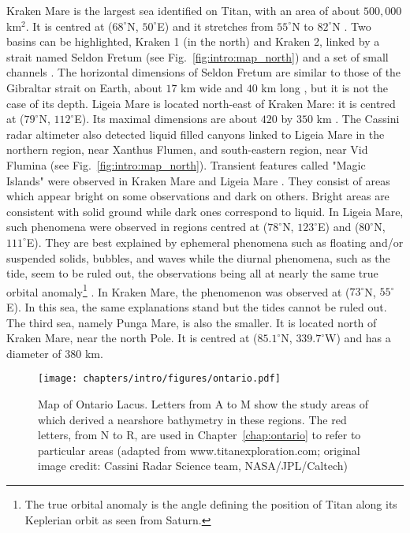  Kraken Mare is the largest sea identified on Titan, with an area of about $500,000$ km$^2$. It is centred at ($68^\circ$N, $50^\circ$E) \citep{tokano2010simulation} and it stretches from $55^\circ$N to $82^\circ$N \citep{lorenz2014radar}. Two basins can be highlighted, Kraken 1 (in the north) and Kraken 2, linked by a strait named Seldon Fretum (see Fig.~\ref{fig:intro:map_north}) and a set of small channels \citep{lorenz2014radar}. The horizontal dimensions of Seldon Fretum are similar to those of the Gibraltar strait on Earth, about $17$ km wide and $40$ km long \citep{lorenz2014radar}, but it is not the case of its depth. Ligeia Mare is located north-east of Kraken Mare: it is centred at ($79^\circ$N, $112^\circ$E). Its maximal dimensions are about $420$ by $350$ km \citep{stofan2012shorelines}. The Cassini radar altimeter also detected liquid filled canyons linked to Ligeia Mare in the northern region, near Xanthus Flumen, and south-eastern region, near Vid Flumina \citep{poggiali2016liquid} (see Fig.~\ref{fig:intro:map_north}). Transient features called "Magic Islands" were observed in Kraken Mare and Ligeia Mare \citep{hofgartner2014transient, hofgartner2016titan}. They consist of areas which appear bright on some observations and dark on others. Bright areas are consistent with solid ground while dark ones correspond to liquid. In Ligeia Mare, such phenomena were observed in regions centred at ($78^\circ$N, $123^\circ$E) and ($80^\circ$N, $111^\circ$E). They are best explained by ephemeral phenomena such as floating and/or suspended solids, bubbles, and waves while the diurnal phenomena, such as the tide, seem to be ruled out, the observations being all at nearly the same true orbital anomaly\footnote{The true orbital anomaly is the angle defining the position of Titan along its Keplerian orbit as seen from Saturn.} \citep{hofgartner2016titan}. In Kraken Mare, the phenomenon was observed at ($73^\circ$N, $55^\circ$E). In this sea, the same explanations stand but the tides cannot be ruled out. The third sea, namely Punga Mare, is also the smaller. It is located north of Kraken Mare, near the north Pole. It is centred at ($85.1^\circ$N, $339.7^\circ$W) and has a diameter of 380 km. 
 
 \begin{figure}
 \centering
 \texttt{[image: chapters/intro/figures/ontario.pdf]}
 \caption{Map of Ontario Lacus. Letters from A to M show the study areas of \citet{hayes2010bathymetry} which derived a nearshore bathymetry in these regions. The red letters, from N to R, are used in Chapter~\ref{chap:ontario} to refer to particular areas (adapted from www.titanexploration.com; original image credit: Cassini Radar Science team, NASA/JPL/Caltech) \label{fig:intro:ontario}}
 \vspace{-0.5cm}
 \end{figure}
 
